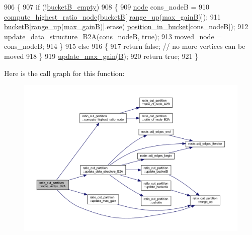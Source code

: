 \begin{DoxyCode}
906 \{
907     \textcolor{keywordflow}{if} (!\mbox{\hyperlink{classratio__cut__partition_af4bbd571d19340f92519240b96b52702}{bucketB\_empty}})
908     \{
909     \mbox{\hyperlink{classnode}{node}} cons\_nodeB =
910         \mbox{\hyperlink{classratio__cut__partition_a11bd0644238997c99e7035507c709e50}{compute\_highest\_ratio\_node}}(\mbox{\hyperlink{classratio__cut__partition_a68f6fa1360b848a0a046e1adf3827f05}{bucketB}}[
      \mbox{\hyperlink{classratio__cut__partition_a5cda26b908793b59881798d88b07344c}{range\_up}}(\mbox{\hyperlink{classratio__cut__partition_af184ffdb46e49b1fc95faa1e6a91cc8e}{max\_gainB}})]);
911     \mbox{\hyperlink{classratio__cut__partition_a68f6fa1360b848a0a046e1adf3827f05}{bucketB}}[\mbox{\hyperlink{classratio__cut__partition_a5cda26b908793b59881798d88b07344c}{range\_up}}(\mbox{\hyperlink{classratio__cut__partition_af184ffdb46e49b1fc95faa1e6a91cc8e}{max\_gainB}})].erase(
      \mbox{\hyperlink{classratio__cut__partition_a871af9a7ed4cb1c101e6620ff99cb8d7}{position\_in\_bucket}}[cons\_nodeB]);
912     \mbox{\hyperlink{classratio__cut__partition_a942a3a035f59f2ab0d1d62da3c878eb8}{update\_data\_structure\_B2A}}(cons\_nodeB, \textcolor{keyword}{true});
913     moved\_node = cons\_nodeB;
914     \}
915     \textcolor{keywordflow}{else}
916     \{
917     \textcolor{keywordflow}{return} \textcolor{keyword}{false};   \textcolor{comment}{// no more vertices can be moved}
918     \}
919     \mbox{\hyperlink{classratio__cut__partition_afbe33417996a8e040d4d802a1116e134}{update\_max\_gain}}(\mbox{\hyperlink{classratio__cut__partition_adf075987228d8adc7950d5b1ba332daa}{B}});
920     \textcolor{keywordflow}{return} \textcolor{keyword}{true};
921 \}
\end{DoxyCode}
Here is the call graph for this function\+:\nopagebreak
\begin{figure}[H]
\begin{center}
\leavevmode
\includegraphics[width=350pt]{classratio__cut__partition_ab192d7130a80b6acf7da704162c51e6c_cgraph}
\end{center}
\end{figure}
